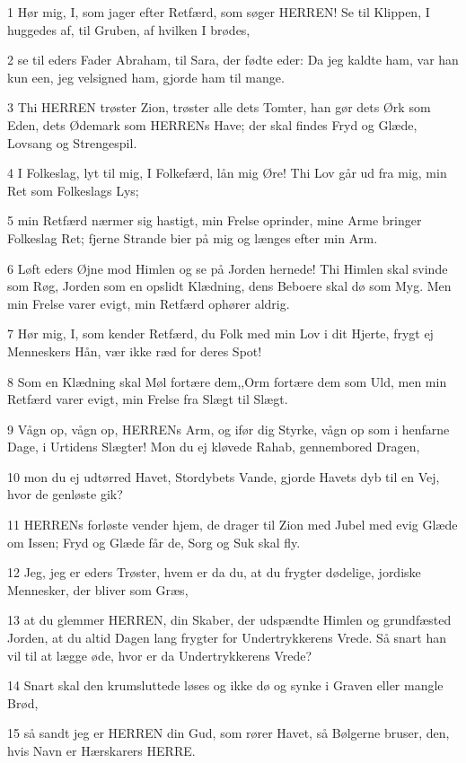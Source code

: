 \par 1 Hør mig, I, som jager efter Retfærd, som søger HERREN! Se til Klippen, I huggedes af, til Gruben, af hvilken I brødes,
\par 2 se til eders Fader Abraham, til Sara, der fødte eder: Da jeg kaldte ham, var han kun een, jeg velsigned ham, gjorde ham til mange.
\par 3 Thi HERREN trøster Zion, trøster alle dets Tomter, han gør dets Ørk som Eden, dets Ødemark som HERRENs Have; der skal findes Fryd og Glæde, Lovsang og Strengespil.
\par 4 I Folkeslag, lyt til mig, I Folkefærd, lån mig Øre! Thi Lov går ud fra mig, min Ret som Folkeslags Lys;
\par 5 min Retfærd nærmer sig hastigt, min Frelse oprinder, mine Arme bringer Folkeslag Ret; fjerne Strande bier på mig og længes efter min Arm.
\par 6 Løft eders Øjne mod Himlen og se på Jorden hernede! Thi Himlen skal svinde som Røg, Jorden som en opslidt Klædning, dens Beboere skal dø som Myg. Men min Frelse varer evigt, min Retfærd ophører aldrig.
\par 7 Hør mig, I, som kender Retfærd, du Folk med min Lov i dit Hjerte, frygt ej Menneskers Hån, vær ikke ræd for deres Spot!
\par 8 Som en Klædning skal Møl fortære dem,,Orm fortære dem som Uld, men min Retfærd varer evigt, min Frelse fra Slægt til Slægt.
\par 9 Vågn op, vågn op, HERRENs Arm, og ifør dig Styrke, vågn op som i henfarne Dage, i Urtidens Slægter! Mon du ej kløvede Rahab, gennembored Dragen,
\par 10 mon du ej udtørred Havet, Stordybets Vande, gjorde Havets dyb til en Vej, hvor de genløste gik?
\par 11 HERRENs forløste vender hjem, de drager til Zion med Jubel med evig Glæde om Issen; Fryd og Glæde får de, Sorg og Suk skal fly.
\par 12 Jeg, jeg er eders Trøster, hvem er da du, at du frygter dødelige, jordiske Mennesker, der bliver som Græs,
\par 13 at du glemmer HERREN, din Skaber, der udspændte Himlen og grundfæsted Jorden, at du altid Dagen lang frygter for Undertrykkerens Vrede. Så snart han vil til at lægge øde, hvor er da Undertrykkerens Vrede?
\par 14 Snart skal den krumsluttede løses og ikke dø og synke i Graven eller mangle Brød,
\par 15 så sandt jeg er HERREN din Gud, som rører Havet, så Bølgerne bruser, den, hvis Navn er Hærskarers HERRE.
